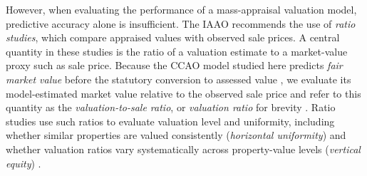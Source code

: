 \documentclass[10pt]{article}
\theoremstyle{definition}
\newcommand{\1}{\mathbf{1}}
\begin{document}
However, when evaluating the performance of a mass-appraisal valuation model, predictive accuracy alone is insufficient. The IAAO recommends the use of \emph{ratio studies}, which compare {appraised values} with observed sale prices. 
{A central quantity in these studies is the ratio of a valuation estimate to a market-value proxy such as sale price. Because the CCAO model studied here predicts \emph{fair market value} before the statutory conversion to assessed value , we evaluate its model-estimated market value relative to the observed sale price and refer to this quantity as the \emph{valuation-to-sale ratio}, or \emph{valuation ratio} for brevity \cite{CCAOModelResAVM2026}. Ratio studies use such ratios to evaluate valuation level and uniformity, including whether similar properties are valued consistently (\emph{horizontal uniformity}) and whether valuation ratios vary systematically across property-value levels (\emph{vertical equity}) \cite{IAAO2013Ratio,IAAO2025Mass,IAAO2026ExposureRatio}.}

\end{document}
